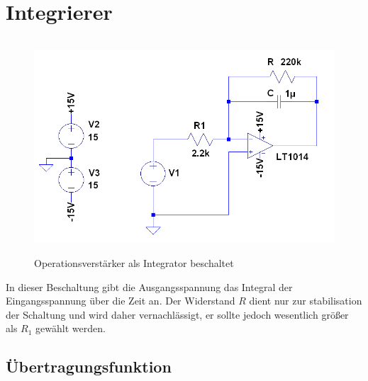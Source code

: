 
\section{Integrierer}

\begin{figure}[H]
 \centering
 \includegraphics[height=8cm,width=12cm]{Simulationen/Integrator}
 \caption{Operationsverstärker als Integrator beschaltet}
\end{figure}
\noindent
In dieser Beschaltung gibt die Ausgangsspannung das Integral der Eingangsspannung über die Zeit an. Der Widerstand $R$ dient nur zur stabilisation
der Schaltung und wird daher vernachlässigt, er sollte jedoch wesentlich größer als $R_1$ gewählt werden.

\subsection{Übertragungsfunktion}

